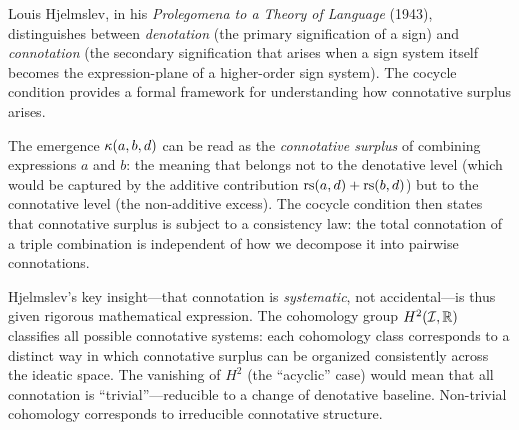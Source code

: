 \begin{interpretation}\label{interp:ch2:hjelmslev_connotation}
Louis Hjelmslev, in his \emph{Prolegomena to a Theory of Language}
(1943), distinguishes between \emph{denotation} (the primary
signification of a sign) and \emph{connotation} (the secondary
signification that arises when a sign system itself becomes the
expression-plane of a higher-order sign system). The cocycle condition
provides a formal framework for understanding how connotative surplus
arises.

The emergence $\kappa(a, b, d)$ can be read as the \emph{connotative
surplus} of combining expressions $a$ and $b$: the meaning that
belongs not to the denotative level (which would be captured by the
additive contribution $\mathrm{rs}(a, d) + \mathrm{rs}(b, d)$) but to the connotative
level (the non-additive excess). The cocycle condition then states that
connotative surplus is subject to a consistency law: the total
connotation of a triple combination is independent of how we decompose
it into pairwise connotations.

Hjelmslev's key insight---that connotation is \emph{systematic}, not
accidental---is thus given rigorous mathematical expression. The
cohomology group $H^2(\mathcal{I}, \mathbb{R})$ classifies all possible connotative
systems: each cohomology class corresponds to a distinct way in which
connotative surplus can be organized consistently across the ideatic
space. The vanishing of $H^2$ (the ``acyclic'' case) would mean that
all connotation is ``trivial''---reducible to a change of denotative
baseline. Non-trivial cohomology corresponds to irreducible
connotative structure.
\end{interpretation}


